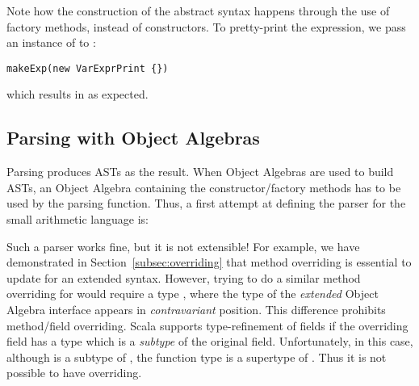 
Note how the construction of the abstract syntax happens through
the use of factory methods, instead of constructors.
To pretty-print the expression,
we pass an instance of  to :

\begin{lstlisting}
makeExp(new VarExprPrint {})
\end{lstlisting}
which results in  as expected.

\subsection{Parsing with Object Algebras}\label{subsec:parsingwithoa}

Parsing produces ASTs as the result. When Object Algebras are used
to build ASTs, an Object Algebra containing the constructor/factory
methods has to be used by the parsing function. Thus, a first attempt
at defining the parser for the small arithmetic language is:

\begin{comment}
\inlinecode{ExprAlg} is defined for a small language using Object Algebras. Since Object Algebras represent ``objects'' implicitly as functions like \inlinecode{ExprAlg[E] =>} \inlinecode{E} for abstract \inlinecode{E}, we first try to build the corresponding parser by type \inlinecode{ExprAlg[E] =>} \inlinecode{Parser[E]}.
\end{comment}

Such a parser works fine, but it is not extensible! For example, we have demonstrated in Section~\ref{subsec:overriding} that method overriding is essential to update  for an extended syntax. However, trying to do a similar method overriding for  would require a type  , where the type of the \emph{extended} Object Algebra interface appears in \emph{contravariant} position. This difference prohibits method/field overriding. Scala supports type-refinement of fields if the overriding
field has a type which is a \emph{subtype} of the original field.
Unfortunately, in this case, although  is a subtype
of , the function type   is a supertype of  . Thus it is not possible to have overriding.

